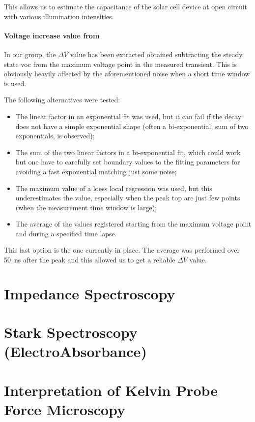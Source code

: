 	This allows us to estimate the capacitance of the solar cell device at open circuit with various illumination intensities.

	\paragraph{Voltage increase value from }\label{tpv_deltaV}

In our group, the $\Delta V$ value has been extracted  obtained subtracting the steady state \gls{voc} from the maximum voltage point in the measured transient. This is obviously heavily affected by the aforementioned noise when a short time window is used.

The following alternatives were tested:
\begin{itemize}
	\item The linear factor in an exponential fit was used, but it can fail if the decay does not have a simple exponential shape (often a bi-exponential, sum of two exponentials, is observed);
	\item The sum of the two linear factors in a bi-exponential fit, which could work but one have to carefully set boundary values to the fitting parameters for avoiding a fast exponential matching just some noise;
	\item The maximum value of a \gls{loess} local regression was used, but this underestimates the value, especially when the peak top are just few points (when the measurement time window is large);
	\item The average of the values registered starting from the maximum voltage point and during a specified time lapse.
\end{itemize}

This last option is the one currently in place. The average was performed over \SI{50}{ns} after the peak and this allowed us to get a reliable $\Delta V$ value.

\section{Impedance Spectroscopy}

\section{Stark Spectroscopy (ElectroAbsorbance)}

\section{Interpretation of Kelvin Probe Force Microscopy}\label{interpretation_kpfm}

